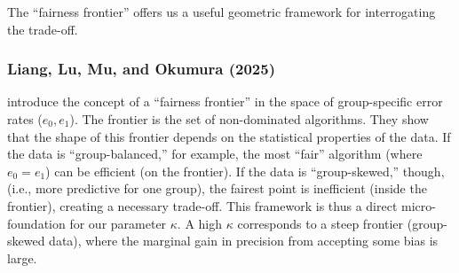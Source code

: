 The ``fairness frontier'' offers us a useful geometric framework for interrogating the trade-off.

\subsubsection{Liang, Lu, Mu, and Okumura (2025)}

\citet{Liang2025} introduce the concept of a ``fairness frontier'' in the space of group-specific error rates ($e_0, e_1$). The frontier is the set of non-dominated algorithms. They show that the shape of this frontier depends on the statistical properties of the data. If the data is ``group-balanced,'' for example, the most ``fair'' algorithm (where $e_0 = e_1$) can be efficient (on the frontier). If the data is ``group-skewed,'' though, (i.e., more predictive for one group), the fairest point is inefficient (inside the frontier), creating a necessary trade-off. This framework is thus a direct micro-foundation for our parameter $\kappa$. A high $\kappa$ corresponds to a steep frontier (group-skewed data), where the marginal gain in precision from accepting some bias is large.
